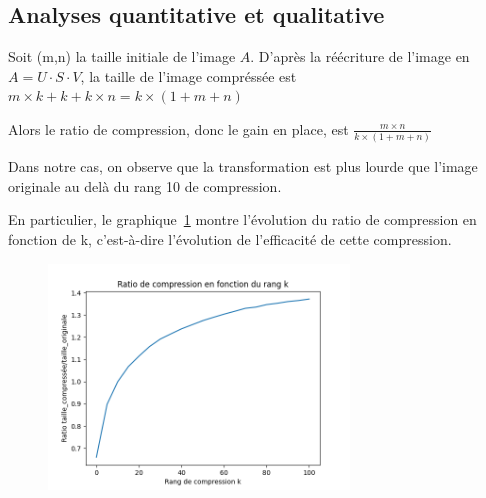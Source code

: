 \documentclass{article}
\begin{document}
\subsection{Analyses quantitative et qualitative}
\label{ssec:quanti_img}

Soit (m,n) la taille initiale de l'image $A$.
D'après la réécriture de l'image en $A = U \cdot S \cdot V$,
la taille de l'image compréssée est $m \times k + k + k \times n = k \times (1+m+n)$

Alors le ratio de compression, donc le gain en place, est $\frac{m \times n}{k \times (1+m+n)}$ \newline

Dans notre cas, on observe que la transformation est plus lourde que l'image originale au delà du rang 10 de compression.

En particulier, le graphique~\ref{img:ratioCompression} montre l'évolution du ratio de compression en fonction de k, c'est-à-dire l'évolution
de l'efficacité de cette compression.

\begin{figure}[!htb]
  \caption[]{}
  \label{img:ratioCompression}
  \centering
  \includegraphics[width=8cm]{../files/ratio_de_compression.png}
\end{figure}
\end{document}
